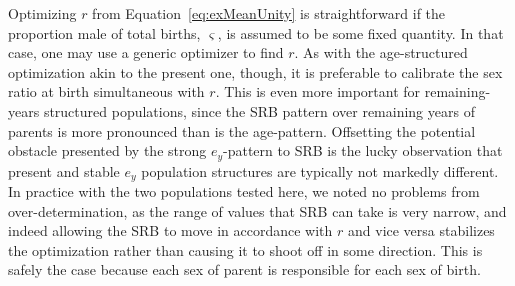 \label{sec:schoenexiterative}
Optimizing $r$ from Equation~\eqref{eq:exMeanUnity} is straightforward if the
proportion male of total births, $\varsigma$, is assumed to be some fixed
quantity. In that case, one may use a generic optimizer to find $r$. As with the
age-structured optimization akin to the present one, though, it is preferable to
calibrate the sex ratio at birth simultaneous with $r$. This is even more
important for remaining-years structured populations, since the SRB pattern over
remaining years of parents is more pronounced than is the age-pattern.
Offsetting the potential obstacle presented by the strong $e_y$-pattern to SRB
is the lucky observation that present and stable $e_y$ population structures are
typically not markedly different. In practice with the two populations tested
here, we noted no problems from over-determination, as the range of values
that SRB can take is very narrow, and indeed allowing the SRB to move in accordance
with $r$ and vice versa stabilizes the optimization rather than causing it to
shoot off in some direction. This is safely the case because each sex of parent
is responsible for each sex of birth.

